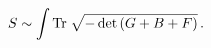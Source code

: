 \begin{equation}
S \sim \int {\rm Tr}\; \sqrt{-\det \left( G + B + F \right)}\,.
\label{eq:NBI}
\end{equation}


